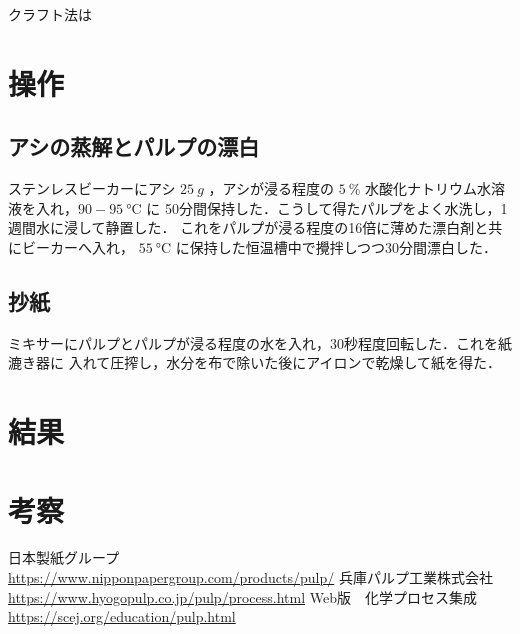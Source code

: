 \documentclass[uplatex, dvipdfmx, 10pt]{jarticle}
\begin{document}
            クラフト法は

        \section*{操作}
            
           \subsection*{アシの蒸解とパルプの漂白}
                
                ステンレスビーカーにアシ $\SI{25}{g}$ ，アシが浸る程度の
                $\SI{5}{\%}$ 水酸化ナトリウム水溶液を入れ，$90-\SI{95}{\celsius}$ に
                50分間保持した．こうして得たパルプをよく水洗し，1週間水に浸して静置した．
                これをパルプが浸る程度の16倍に薄めた漂白剤と共にビーカーへ入れ，
                $\SI{55}{\celsius}$ に保持した恒温槽中で攪拌しつつ30分間漂白した．

            \subsection*{抄紙}

                ミキサーにパルプとパルプが浸る程度の水を入れ，30秒程度回転した．これを紙漉き器に
                入れて圧搾し，水分を布で除いた後にアイロンで乾燥して紙を得た．


        \section*{結果}

        \section*{考察}

            
        \begin{thebibliography}{99}
             日本製紙グループ 
                \\\url{https://www.nipponpapergroup.com/products/pulp/}
             兵庫パルプ工業株式会社 
                \\\url{https://www.hyogopulp.co.jp/pulp/process.html}
             Web版　化学プロセス集成 
                \\\url{https://scej.org/education/pulp.html}
        \end{thebibliography}

    
\end{document}
